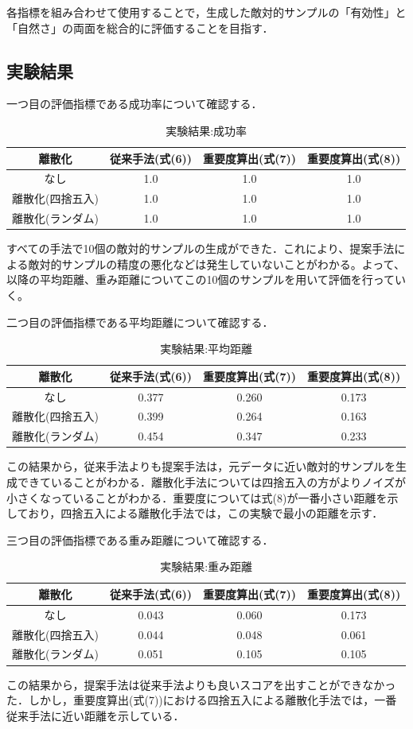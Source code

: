 各指標を組み合わせて使用することで，生成した敵対的サンプルの「有効性」と「自然さ」の両面を総合的に評価することを目指す．

\subsection{実験結果}
一つ目の評価指標である成功率について確認する．
\begin{table}[H]
    \centering
    \caption{実験結果:成功率}
    \begin{tabular}{|c|c|c|c|} \hline
        離散化 & 従来手法(式(6)) & 重要度算出(式(7)) & 重要度算出(式(8)) \\ \hline
        なし & 1.0 & 1.0 & 1.0 \\ \hline
        離散化(四捨五入) & 1.0 & 1.0 & 1.0 \\ \hline
        離散化(ランダム) & 1.0 & 1.0 & 1.0 \\ \hline
    \end{tabular}
\end{table}
すべての手法で10個の敵対的サンプルの生成ができた．これにより、提案手法による敵対的サンプルの精度の悪化などは発生していないことがわかる。よって、以降の平均距離、重み距離についてこの10個のサンプルを用いて評価を行っていく。

二つ目の評価指標である平均距離について確認する．
\begin{table}[H]
    \centering
    \caption{実験結果:平均距離}
    \begin{tabular}{|c|c|c|c|} \hline
        離散化 & 従来手法(式(6)) & 重要度算出(式(7)) & 重要度算出(式(8)) \\ \hline
        なし & 0.377 & 0.260 & 0.173 \\ \hline
        離散化(四捨五入) & 0.399 & 0.264 & 0.163 \\ \hline
        離散化(ランダム) & 0.454 & 0.347 & 0.233 \\ \hline
    \end{tabular}
\end{table}
この結果から，従来手法よりも提案手法は，元データに近い敵対的サンプルを生成できていることがわかる．離散化手法については四捨五入の方がよりノイズが小さくなっていることがわかる．重要度については式(8)が一番小さい距離を示しており，四捨五入による離散化手法では，この実験で最小の距離を示す．

三つ目の評価指標である重み距離について確認する．
\begin{table}[H]
    \centering
    \caption{実験結果:重み距離}
    \begin{tabular}{|c|c|c|c|} \hline
        離散化 & 従来手法(式(6)) & 重要度算出(式(7)) & 重要度算出(式(8)) \\ \hline
        なし & 0.043 & 0.060 & 0.173\\ \hline
        離散化(四捨五入) & 0.044 & 0.048 & 0.061 \\ \hline
        離散化(ランダム) & 0.051 & 0.105 & 0.105 \\ \hline
    \end{tabular}
\end{table}
この結果から，提案手法は従来手法よりも良いスコアを出すことができなかった．しかし，重要度算出(式(7))における四捨五入による離散化手法では，一番従来手法に近い距離を示している．

